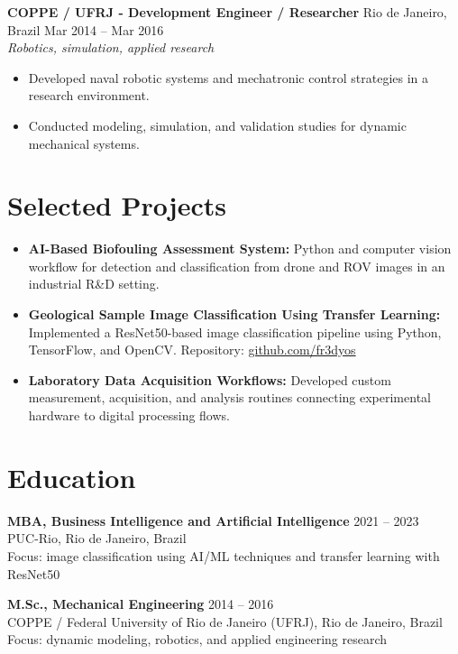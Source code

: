 \documentclass[11pt,a4paper]{article}
\newcommand{\job}[4]{\textbf{#1} \hfill #2\\\textit{#3}\\#4\vspace{6pt}}
\begin{document}
\job{COPPE / UFRJ - Development Engineer / Researcher}{Rio de Janeiro, Brazil \hfill Mar 2014 -- Mar 2016}{Robotics, simulation, applied research}{
\begin{itemize}[leftmargin=*,itemsep=2pt,topsep=2pt]
\item Developed naval robotic systems and mechatronic control strategies in a research environment.
\item Conducted modeling, simulation, and validation studies for dynamic mechanical systems.
\end{itemize}}

\section*{Selected Projects}
\begin{itemize}[leftmargin=*,itemsep=2pt,topsep=2pt]
\item \textbf{AI-Based Biofouling Assessment System:} Python and computer vision workflow for detection and classification from drone and ROV images in an industrial R\&D setting.
\item \textbf{Geological Sample Image Classification Using Transfer Learning:} Implemented a ResNet50-based image classification pipeline using Python, TensorFlow, and OpenCV. Repository: \href{https://github.com/fr3dyos}{github.com/fr3dyos}
\item \textbf{Laboratory Data Acquisition Workflows:} Developed custom measurement, acquisition, and analysis routines connecting experimental hardware to digital processing flows.
\end{itemize}

\section*{Education}
\textbf{MBA, Business Intelligence and Artificial Intelligence} \hfill 2021 -- 2023\\
PUC-Rio, Rio de Janeiro, Brazil\\
Focus: image classification using AI/ML techniques and transfer learning with ResNet50

\vspace{4pt}
\textbf{M.Sc., Mechanical Engineering} \hfill 2014 -- 2016\\
COPPE / Federal University of Rio de Janeiro (UFRJ), Rio de Janeiro, Brazil\\
Focus: dynamic modeling, robotics, and applied engineering research
\end{document}
